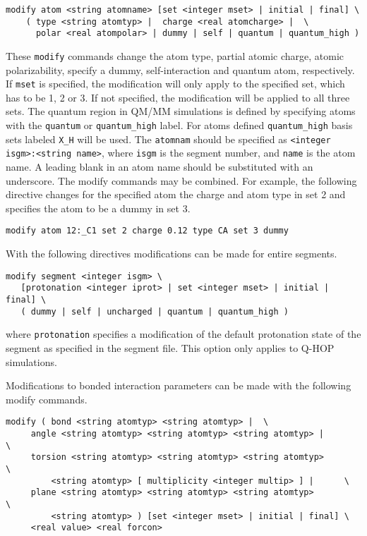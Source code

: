 \begin{verbatim}
modify atom <string atomname> [set <integer mset> | initial | final] \
	( type <string atomtyp> |  charge <real atomcharge> |  \
	  polar <real atompolar> | dummy | self | quantum | quantum_high )
\end{verbatim}

These \verb+modify+ commands change the atom type, partial atomic charge,
atomic polarizability, specify a dummy, self-interaction and quantum atom,
respectively. If \verb+mset+ is specified, the modification will only
apply to the specified set, which has to be 1, 2 or 3. If not specified,
the modification will be applied to all three sets. The quantum region in
QM/MM simulations is defined by specifying atoms with the \verb+quantum+
or \verb+quantum_high+ label. For atoms defined \verb+quantum_high+
basis sets labeled \verb+X_H+ will be used.
The \verb+atomnam+
should be specified as \verb+<integer isgm>:<string name>+, where
\verb+isgm+ is the segment number, and \verb+name+ is the atom name. A
leading blank in an atom name should be substituted with an underscore.
The modify commands may be combined. For example, the following directive
changes for the specified atom the charge and atom type in set 2 and 
specifies the atom to be a dummy in set 3.

\begin{verbatim}
modify atom 12:_C1 set 2 charge 0.12 type CA set 3 dummy
\end{verbatim}

With the following directives modifications can be made for entire
segments.

\begin{verbatim}
modify segment <integer isgm> \
   [protonation <integer iprot> | set <integer mset> | initial | final] \
   ( dummy | self | uncharged | quantum | quantum_high )
\end{verbatim}

where \verb+protonation+ specifies a modification of the default protonation
state of the segment as specified in the segment file. This option only applies
to Q-HOP simulations.

Modifications to bonded interaction parameters can be made with the
following modify commands.

\begin{verbatim}
modify ( bond <string atomtyp> <string atomtyp> |  \
	 angle <string atomtyp> <string atomtyp> <string atomtyp> |        \ 
 	 torsion <string atomtyp> <string atomtyp> <string atomtyp>        \
		 <string atomtyp> [ multiplicity <integer multip> ] |      \
	 plane <string atomtyp> <string atomtyp> <string atomtyp>          \
		 <string atomtyp> ) [set <integer mset> | initial | final] \
	 <real value> <real forcon>
\end{verbatim}


